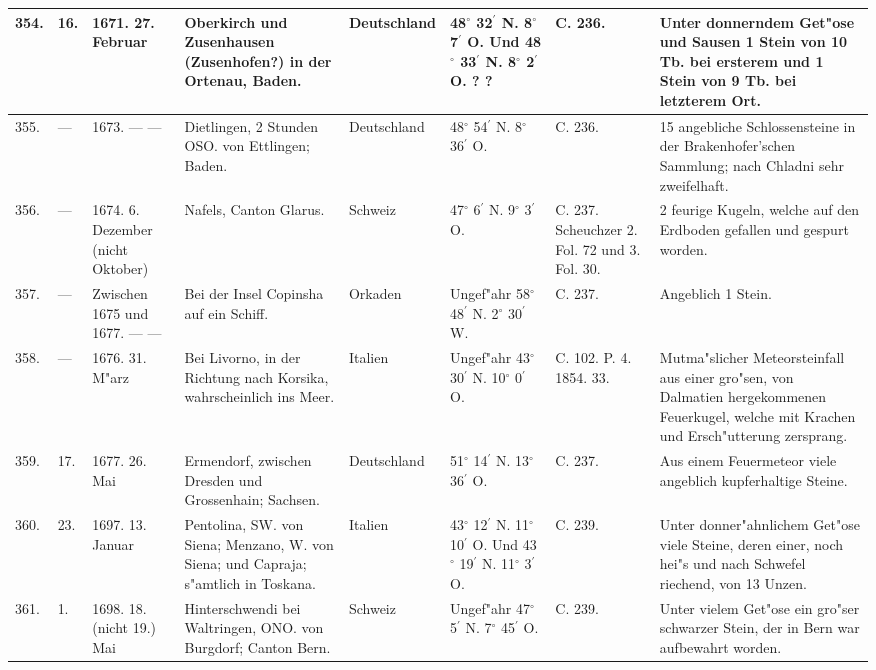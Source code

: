 \documentclass[a4paper, 8pt, oneside, polutonikogreek, german]{article}
\begin{document}
\begin{center}
\begin{longtable}{| p{5mm} | p{3mm} | p{15mm} | p{25mm} | p{20mm} | p{14mm} | p{17mm} | p{24mm} |}
        354. & 16. & 1671. 27. Februar & Oberkirch und Zusenhausen (Zusenhofen?) in der Ortenau, Baden. & Deutschland & 48$^\circ$ 32$^\prime$ N. 8$^\circ$ 7$^\prime$ O. Und 48$^\circ$ 33$^\prime$ N. 8$^\circ$ 2$^\prime$ O. ? ? & C. 236. & Unter donnerndem Get"ose und Sausen 1 Stein von 10 Tb. bei ersterem und 1 Stein von 9 Tb. bei letzterem Ort. \\ \hline
        355. & --- & 1673. --- --- & Dietlingen, 2 Stunden OSO. von Ettlingen; Baden. & Deutschland & 48$^\circ$ 54$^\prime$ N. 8$^\circ$ 36$^\prime$ O. & C. 236. & 15 angebliche Schlossensteine in der Brakenhofer’schen Sammlung; nach Chladni sehr zweifelhaft. \\ \hline
        356. & --- & 1674. 6. Dezember (nicht Oktober) & Nafels, Canton Glarus. & Schweiz & 47$^\circ$ 6$^\prime$ N. 9$^\circ$ 3$^\prime$ O. & C. 237. Scheuchzer 2. Fol. 72 und 3. Fol. 30. & 2 feurige Kugeln, welche auf den Erdboden gefallen und gespurt worden. \\ \hline
        357. & --- & Zwischen 1675 und 1677. --- --- & Bei der Insel Copinsha auf ein Schiff. & Orkaden & Ungef"ahr 58$^\circ$ 48$^\prime$ N. 2$^\circ$ 30$^\prime$ W. & C. 237. & Angeblich 1 Stein. \\ \hline
        358. & --- & 1676. 31. M"arz & Bei Livorno, in der Richtung nach Korsika, wahrscheinlich ins Meer. & Italien & Ungef"ahr 43$^\circ$ 30$^\prime$ N. 10$^\circ$ 0$^\prime$ O. & C. 102. P. 4. 1854. 33. & Mutma"slicher Meteorsteinfall aus einer gro"sen, von Dalmatien hergekommenen Feuerkugel, welche mit Krachen und Ersch"utterung zersprang. \\ \hline
        359. & 17. & 1677. 26. Mai & Ermendorf, zwischen Dresden und Grossenhain; Sachsen. & Deutschland & 51$^\circ$ 14$^\prime$ N. 13$^\circ$ 36$^\prime$ O. & C. 237. & Aus einem Feuermeteor viele angeblich kupferhaltige Steine. \\ \hline
        360. & 23. & 1697. 13. Januar & Pentolina, SW. von Siena; Menzano, W. von Siena; und Capraja; s"amtlich in Toskana. & Italien & 43$^\circ$ 12$^\prime$ N. 11$^\circ$ 10$^\prime$ O. Und 43$^\circ$ 19$^\prime$ N. 11$^\circ$ 3$^\prime$ O. & C. 239. & Unter donner"ahnlichem Get"ose viele Steine, deren einer, noch hei"s und nach Schwefel riechend, von 13 Unzen. \\ \hline
        361. & 1. & 1698. 18. (nicht 19.) Mai & Hinterschwendi bei Waltringen, ONO. von Burgdorf; Canton Bern. & Schweiz & Ungef"ahr 47$^\circ$ 5$^\prime$ N. 7$^\circ$ 45$^\prime$ O. & C. 239. & Unter vielem Get"ose ein gro"ser schwarzer Stein, der in Bern war aufbewahrt worden. \\ \hline

\end{longtable}
\end{center}
\end{document}
